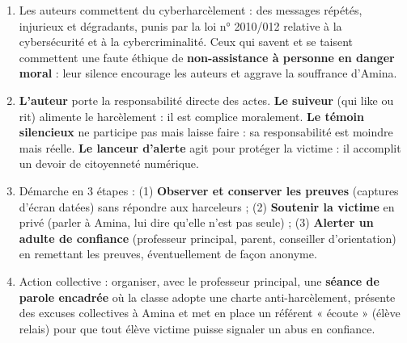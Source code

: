 \documentclass[11pt]{article}
\newcommand{\cle}[1]{{\popxbold\color{popdark}#1}}
\begin{document}
\begin{corrige}
\begin{enumerate}
\item Les auteurs commettent du \cle{cyberharcèlement} : des messages répétés, injurieux et dégradants, punis par la loi n° 2010/012 relative à la cybersécurité et à la cybercriminalité. Ceux qui savent et se taisent commettent une faute éthique de \textbf{non-assistance à personne en danger moral} : leur silence encourage les auteurs et aggrave la souffrance d'Amina.
\item \textbf{L'auteur} porte la responsabilité directe des actes. \textbf{Le suiveur} (qui like ou rit) alimente le harcèlement : il est complice moralement. \textbf{Le témoin silencieux} ne participe pas mais laisse faire : sa responsabilité est moindre mais réelle. \textbf{Le lanceur d'alerte} agit pour protéger la victime : il accomplit un devoir de \cle{citoyenneté numérique}.
\item Démarche en 3 étapes : (1) \textbf{Observer et conserver les preuves} (captures d'écran datées) sans répondre aux harceleurs ; (2) \textbf{Soutenir la victime} en privé (parler à Amina, lui dire qu'elle n'est pas seule) ; (3) \textbf{Alerter un adulte de confiance} (professeur principal, parent, conseiller d'orientation) en remettant les preuves, éventuellement de façon anonyme.
\item Action collective : organiser, avec le professeur principal, une \textbf{séance de parole encadrée} où la classe adopte une charte anti-harcèlement, présente des excuses collectives à Amina et met en place un référent « écoute » (élève relais) pour que tout élève victime puisse signaler un abus en confiance.
\end{enumerate}
\end{corrige}
\end{document}
